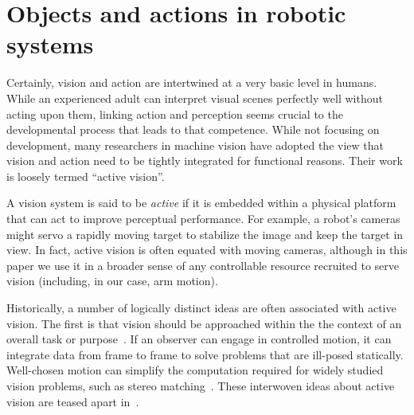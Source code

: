 \section{Objects and actions in robotic systems}

Certainly, vision and action are intertwined at a very basic level in
humans.  While an experienced adult can interpret visual scenes
perfectly well without acting upon them, linking action and perception
seems crucial to the developmental process that leads to that
competence.  While not focusing on development, many researchers in
machine vision have adopted the view that vision and action need to be
tightly integrated for functional reasons.  Their work is loosely
termed ``active vision''.

A vision system is said to be {\em active} if it is embedded within a
physical platform that can act to improve perceptual performance.  For
example, a robot's cameras might servo a rapidly moving target to
stabilize the image and keep the target in view.  In fact, active
vision is often equated with moving cameras, although in this paper we
use it in a broader sense of any controllable resource recruited to
serve vision (including, in our case, arm motion).

Historically, a number of logically distinct ideas are often
associated with active vision.  The first is that vision should be
approached within the the context of an overall task or
purpose~\cite{aloimonos87active}.  If an observer can engage in
controlled motion, it can integrate data from frame to frame to solve
problems that are ill-posed statically.  Well-chosen motion can
simplify the computation required for widely studied vision problems,
such as stereo matching~\cite{bajcsy88active,ballard91animate}.  These
interwoven ideas about active vision are teased apart
in~\cite{tarr94computational}.

